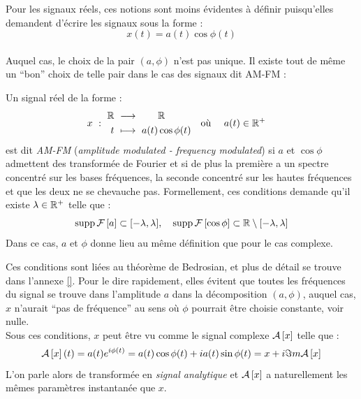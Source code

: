 Pour les signaux réels, ces notions sont moins évidentes à définir puisqu'elles demandent d'écrire les signaux sous la forme :
\[x(t) = a(t) \cos\phi(t)\]
\\
Auquel cas, le choix de la pair $(a,\phi)$ n'est pas unique. Il existe tout de même un ``bon'' choix de telle pair dans le cas des signaux dit AM-FM :
\begin{definition}[Signal AM-FM]
	Un signal réel de la forme :
	\begin{align}
		x\ &:\ \begin{aligned}\mathbb{R}\ &\longrightarrow\qquad \mathbb{R} \\
			t\ &\longmapsto\ a(t) \cos\phi(t)
		\end{aligned}  &  \text{où }\quad a(t)\in\mathbb{R}^+\quad
	\end{align}
	est dit \emph{AM-FM} (\emph{amplitude modulated - frequency modulated}) si $a$ et $\cos\phi$ admettent des transformée de Fourier et si de plus la première a un spectre concentré sur les bases fréquences, la seconde concentré sur les hautes fréquences et que les deux ne se chevauche pas.
	Formellement, ces conditions demande qu'il existe $\lambda\in\mathbb{R}^+$ telle que :
	\begin{equation}\label{eq:condi_AM-FM}
		\text{\normalfont supp}\, \mathcal{F}\left[a\right] \subset [-\lambda, \lambda],\quad \text{\normalfont supp}\, \mathcal{F}\left[\cos\phi\right] \subset \mathbb{R}\setminus[-\lambda,\lambda]
	\end{equation}
	Dans ce cas, $a$ et $\phi$ donne lieu au même définition que pour le cas complexe.
\end{definition}
\skipl
Ces conditions sont liées au théorème de Bedrosian, et plus de détail se trouve dans l'annexe \ref{}. Pour le dire rapidement, elles évitent que toutes les fréquences du signal se trouve dans l'amplitude $a$ dans la décomposition $(a,\phi)$, auquel cas, $x$ n'aurait ``pas de fréquence'' au sens où $\phi$ pourrait être choisie constante, voir nulle.
\\
Sous ces conditions, $x$ peut être vu comme le signal complexe $\mathcal{A}\left[x\right]$ telle que :
\[\mathcal{A}\left[x\right](t) = a(t) e^{i\phi(t)}= a(t)\cos\phi(t) + ia(t)\sin\phi(t) = x  + i\Im m \mathcal{A}\left[x\right]\]
L'on parle alors de transformée en \emph{signal analytique} et $\mathcal{A}\left[x\right]$ a naturellement les mêmes paramètres instantanée que $x$.
\\



